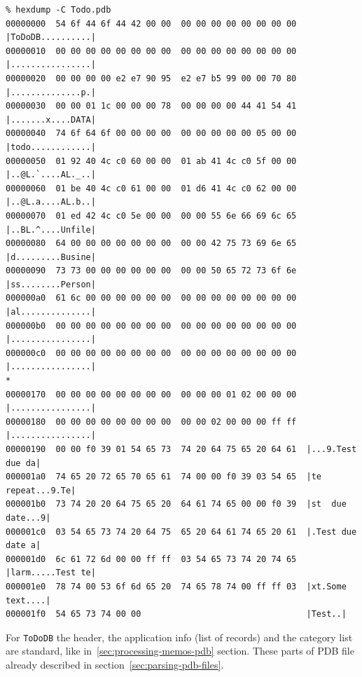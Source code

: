 \documentclass[a4paper,12pt,oneside]{scrartcl}
\begin{document}
\footnotesize
\begin{verbatim}
% hexdump -C Todo.pdb
00000000  54 6f 44 6f 44 42 00 00  00 00 00 00 00 00 00 00  |ToDoDB..........|
00000010  00 00 00 00 00 00 00 00  00 00 00 00 00 00 00 00  |................|
00000020  00 00 00 00 e2 e7 90 95  e2 e7 b5 99 00 00 70 80  |..............p.|
00000030  00 00 01 1c 00 00 00 78  00 00 00 00 44 41 54 41  |.......x....DATA|
00000040  74 6f 64 6f 00 00 00 00  00 00 00 00 00 05 00 00  |todo............|
00000050  01 92 40 4c c0 60 00 00  01 ab 41 4c c0 5f 00 00  |..@L.`....AL._..|
00000060  01 be 40 4c c0 61 00 00  01 d6 41 4c c0 62 00 00  |..@L.a....AL.b..|
00000070  01 ed 42 4c c0 5e 00 00  00 00 55 6e 66 69 6c 65  |..BL.^....Unfile|
00000080  64 00 00 00 00 00 00 00  00 00 42 75 73 69 6e 65  |d.........Busine|
00000090  73 73 00 00 00 00 00 00  00 00 50 65 72 73 6f 6e  |ss........Person|
000000a0  61 6c 00 00 00 00 00 00  00 00 00 00 00 00 00 00  |al..............|
000000b0  00 00 00 00 00 00 00 00  00 00 00 00 00 00 00 00  |................|
000000c0  00 00 00 00 00 00 00 00  00 00 00 00 00 00 00 00  |................|
*
00000170  00 00 00 00 00 00 00 00  00 00 00 01 02 00 00 00  |................|
00000180  00 00 00 00 00 00 00 00  00 00 02 00 00 00 ff ff  |................|
00000190  00 00 f0 39 01 54 65 73  74 20 64 75 65 20 64 61  |...9.Test due da|
000001a0  74 65 20 72 65 70 65 61  74 00 00 f0 39 03 54 65  |te repeat...9.Te|
000001b0  73 74 20 20 64 75 65 20  64 61 74 65 00 00 f0 39  |st  due date...9|
000001c0  03 54 65 73 74 20 64 75  65 20 64 61 74 65 20 61  |.Test due date a|
000001d0  6c 61 72 6d 00 00 ff ff  03 54 65 73 74 20 74 65  |larm.....Test te|
000001e0  78 74 00 53 6f 6d 65 20  74 65 78 74 00 ff ff 03  |xt.Some text....|
000001f0  54 65 73 74 00 00                                 |Test..|
\end{verbatim}
\normalsize

For \texttt{ToDoDB} the header, the application info (list of records) and the
category list are standard, like in~\ref{sec:processing-memos-pdb}
section. These parts of PDB file already described in
section~\ref{sec:parsing-pdb-files}.
\end{document}

